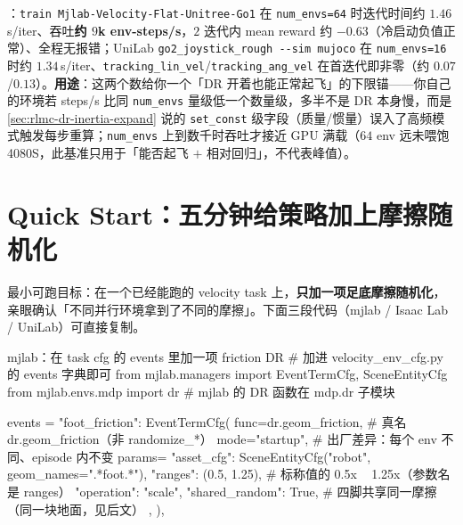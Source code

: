 \begin{finenote}
：\verb|train Mjlab-Velocity-Flat-Unitree-Go1| 在 \verb|num_envs=64| 时迭代时间约 $1.46$\,s/iter、吞吐\textbf{约 $9$k env-steps/s}，$2$ 迭代内 mean reward 约 $-0.63$（冷启动负值正常）、全程无报错；UniLab \verb|go2_joystick_rough --sim mujoco| 在 \verb|num_envs=16| 时约 $1.34$\,s/iter、\verb|tracking_lin_vel|/\verb|tracking_ang_vel| 在首迭代即非零（约 $0.07$/$0.13$）。\textbf{用途}：这两个数给你一个「DR 开着也能正常起飞」的下限锚——你自己的环境若 steps/s 比同 \verb|num_envs| 量级低一个数量级，多半不是 DR 本身慢，而是 \cref{sec:rlmc-dr-inertia-expand} 说的 \verb|set_const| 级字段（质量/惯量）误入了高频模式触发每步重算；\verb|num_envs| 上到数千时吞吐才接近 GPU 满载（$64$ env 远未喂饱 4080S，此基准只用于「能否起飞 $+$ 相对回归」，不代表峰值）。
\end{finenote}

\section*{Quick Start：五分钟给策略加上摩擦随机化}
\label{sec:rlmc-dr-quickstart}

最小可跑目标：在一个已经能跑的 velocity task 上，\textbf{只加一项足底摩擦随机化}，亲眼确认「不同并行环境拿到了不同的摩擦」。下面三段代码（mjlab / Isaac Lab / UniLab）可直接复制。

\begin{codebox}[Python]{mjlab：在 task cfg 的 events 里加一项 friction DR}
# 加进 velocity_env_cfg.py 的 events 字典即可
from mjlab.managers import EventTermCfg, SceneEntityCfg
from mjlab.envs.mdp import dr                # mjlab 的 DR 函数在 mdp.dr 子模块

events = {
    "foot_friction": EventTermCfg(
        func=dr.geom_friction,                # 真名 dr.geom_friction（非 randomize_*）
        mode="startup",                       # 出厂差异：每个 env 不同、episode 内不变
        params={
            "asset_cfg": SceneEntityCfg("robot", geom_names=".*foot.*"),
            "ranges": (0.5, 1.25),            # 标称值的 0.5x ~ 1.25x（参数名是 ranges）
            "operation": "scale",
            "shared_random": True,            # 四脚共享同一摩擦（同一块地面，见后文）
        },
    ),
}
\end{codebox}

